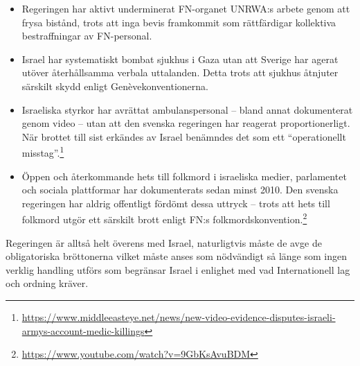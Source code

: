 \begin{itemize}
    \item Regeringen har aktivt underminerat FN-organet UNRWA:s arbete genom att frysa bistånd, trots att inga bevis framkommit som rättfärdigar kollektiva bestraffningar av FN-personal.
    
    \item Israel har systematiskt bombat sjukhus i Gaza utan att Sverige har agerat utöver återhållsamma verbala uttalanden. Detta trots att sjukhus åtnjuter särskilt skydd enligt Genèvekonventionerna.
    
    \item Israeliska styrkor har avrättat ambulanspersonal – bland annat dokumenterat genom video – utan att den svenska regeringen har reagerat proportionerligt. När brottet till sist erkändes av Israel benämndes det som ett \enquote{operationellt misstag}.\footnote{\url{https://www.middleeasteye.net/news/new-video-evidence-disputes-israeli-armys-account-medic-killings}}
    
    \item Öppen och återkommande hets till folkmord i israeliska medier, parlamentet och sociala plattformar har dokumenterats sedan minst 2010. Den svenska regeringen har aldrig offentligt fördömt dessa uttryck – trots att hets till folkmord utgör ett särskilt brott enligt FN:s folkmordskonvention.\footnote{\url{https://www.youtube.com/watch?v=9GbKsAvuBDM}}
\end{itemize}

Regeringen är alltså helt överens med Israel, naturligtvis måste de avge de obligatoriska bröttonerna vilket måste anses som nödvändigt så
länge som ingen verklig handling utförs som begränsar Israel i enlighet med vad Internationell lag och ordning kräver.

